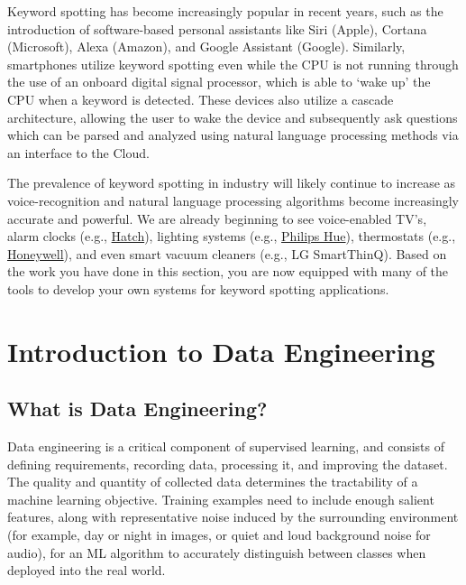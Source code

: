 Keyword spotting has become increasingly popular in recent years, such as the introduction of software-based personal assistants like Siri (Apple), Cortana (Microsoft), Alexa (Amazon), and Google Assistant (Google). Similarly, smartphones utilize keyword spotting even while the CPU is not running through the use of an onboard digital signal processor, which is able to ‘wake up’ the CPU when a keyword is detected. These devices also utilize a cascade architecture, allowing the user to wake the device and subsequently ask questions which can be parsed and analyzed using natural language processing methods via an interface to the Cloud.

The prevalence of keyword spotting in industry will likely continue to increase as voice-recognition and natural language processing algorithms become increasingly accurate and powerful. We are already beginning to see voice-enabled TV’s, alarm clocks (e.g., \href{https://www.hatch.co/?gclid=Cj0KCQiAqdP9BRDVARIsAGSZ8AnmIZ51ebceO9mQPDPBQaTHYdHLfXs569h-iQyGx9mQUc8o4-Jb1YgaAkPZEALw_wcB}{Hatch}), lighting systems (e.g., \href{https://www.philips-hue.com/en-us/explore-hue/works-with/voice-control}{Philips Hue}), thermostats (e.g., \href{https://www.honeywellstore.com/store/products/wi-fi-smart-thermostat-with-voice-rth9590wf1003u.htm}{Honeywell}), and even smart vacuum cleaners (e.g., LG SmartThinQ). Based on the work you have done in this section, you are now equipped with many of the tools to develop your own systems for keyword spotting applications.



\section{Introduction to Data Engineering}


\subsection{What is Data Engineering?}

Data engineering is a critical component of supervised learning, and consists of defining requirements, recording data, processing it, and improving the dataset. The quality and quantity of collected data determines the tractability of a machine learning objective. Training examples need to include enough salient features, along with representative noise induced by the surrounding environment (for example, day or night in images, or quiet and loud background noise for audio), for an ML algorithm to accurately distinguish between classes when deployed into the real world.

